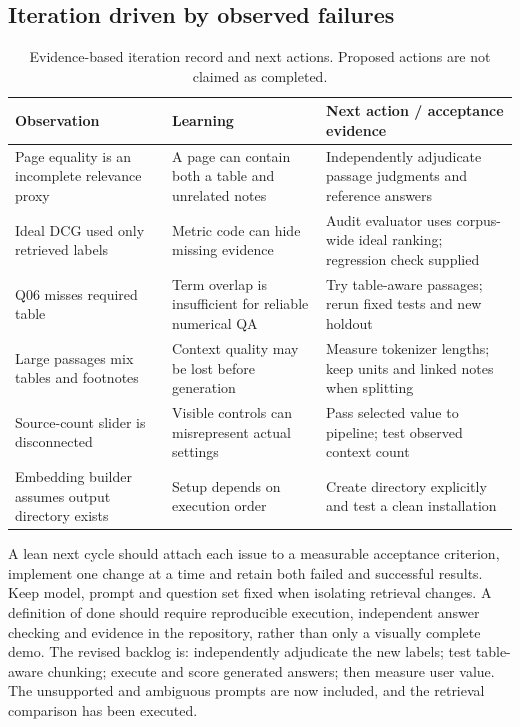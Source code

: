 \documentclass[11pt,a4paper]{article}
\begin{document}
\subsection{Iteration driven by observed failures}
\begin{table}[htbp]\centering\small
\caption{Evidence-based iteration record and next actions. Proposed actions are not claimed as completed.}
\begin{tabularx}{\textwidth}{p{30mm}Y Y}\toprule
Observation & Learning & Next action / acceptance evidence\\\midrule
Page equality is an incomplete relevance proxy & A page can contain both a table and unrelated notes & Independently adjudicate passage judgments and reference answers\\
Ideal DCG used only retrieved labels & Metric code can hide missing evidence & Audit evaluator uses corpus-wide ideal ranking; regression check supplied\\
Q06 misses required table & Term overlap is insufficient for reliable numerical QA & Try table-aware passages; rerun fixed tests and new holdout\\
Large passages mix tables and footnotes & Context quality may be lost before generation & Measure tokenizer lengths; keep units and linked notes when splitting\\
Source-count slider is disconnected & Visible controls can misrepresent actual settings & Pass selected value to pipeline; test observed context count\\
Embedding builder assumes output directory exists & Setup depends on execution order & Create directory explicitly and test a clean installation\\\bottomrule
\end{tabularx}
\end{table}

A lean next cycle should attach each issue to a measurable acceptance criterion, implement one change at a time and retain both failed and successful results. Keep model, prompt and question set fixed when isolating retrieval changes. A definition of done should require reproducible execution, independent answer checking and evidence in the repository, rather than only a visually complete demo. The revised backlog is: independently adjudicate the new labels; test table-aware chunking; execute and score generated answers; then measure user value. The unsupported and ambiguous prompts are now included, and the retrieval comparison has been executed.
\end{document}
